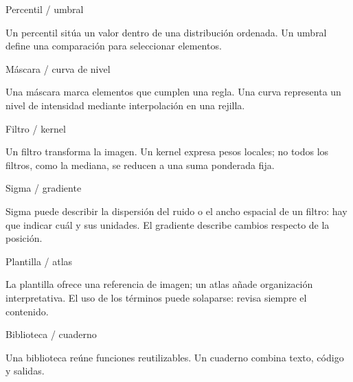 
\begin{Idea}{Percentil / umbral}

Un percentil sitúa un valor dentro de una distribución ordenada. Un umbral define una comparación para seleccionar elementos.


\end{Idea}


\begin{Idea}{Máscara / curva de nivel}

Una máscara marca elementos que cumplen una regla. Una curva representa un nivel de intensidad mediante interpolación en una rejilla.


\end{Idea}


\begin{Idea}{Filtro / kernel}

Un filtro transforma la imagen. Un kernel expresa pesos locales; no todos los filtros, como la mediana, se reducen a una suma ponderada fija.


\end{Idea}


\begin{Idea}{Sigma / gradiente}

Sigma puede describir la dispersión del ruido o el ancho espacial de un filtro: hay que indicar cuál y sus unidades. El gradiente describe cambios respecto de la posición.


\end{Idea}


\begin{Idea}{Plantilla / atlas}

La plantilla ofrece una referencia de imagen; un atlas añade organización interpretativa. El uso de los términos puede solaparse: revisa siempre el contenido.


\end{Idea}


\begin{Idea}{Biblioteca / cuaderno}

Una biblioteca reúne funciones reutilizables. Un cuaderno combina texto, código y salidas.


\end{Idea}

